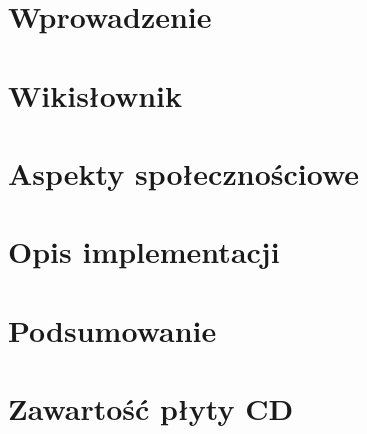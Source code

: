 

\chapter{Wprowadzenie}


\chapter{Wikisłownik}


\chapter{Aspekty społecznościowe}


\chapter{Opis implementacji}


\chapter{Podsumowanie}


\appendix
\chapter{Zawartość płyty CD}


%


